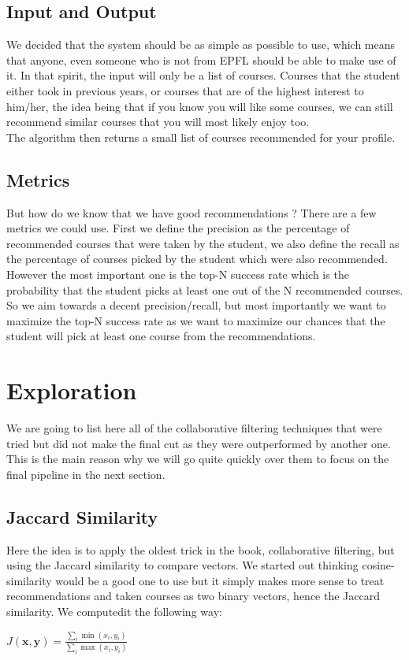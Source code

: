 \documentclass{article}
\begin{document}
    \subsection{Input and Output}
        We decided that the system should be as simple as possible to use, which means that anyone, even someone who is not from EPFL should be able to make use of it. In that spirit, the input will only be a list of courses. Courses that the student either took in previous years, or courses that are of the highest interest to him/her, the idea being that if you know you will like some courses, we can still recommend similar courses that you will most likely enjoy too.
        \\The algorithm then returns a small list of courses recommended for your profile.

    \subsection{Metrics}
        But how do we know that we have good recommendations ? There are a few metrics we could use. First we define the precision as the percentage of recommended courses that were taken by the student, we also define the recall as the percentage of courses picked by the student which were also recommended.
        \\However the most important one is the top-N success rate which is the probability that the student picks at least one out of the N recommended courses. So we aim towards a decent precision/recall, but most importantly we want to maximize the top-N success rate as we want to maximize our chances that the student will pick at least one course from the recommendations.

\newpage
\section{Exploration}
    We are going to list here all of the collaborative filtering techniques that were tried but did not make the final cut as they were outperformed by another one. This is the main reason why we will go quite quickly over them to focus on the final pipeline in the next section.

    \subsection{Jaccard Similarity}
        Here the idea is to apply the oldest trick in the book, collaborative filtering, but using the Jaccard similarity\cite{jaccard} to compare vectors. We started out thinking cosine-similarity would be a good one to use but it simply makes more sense to treat recommendations and taken courses as two binary vectors, hence the Jaccard similarity\cite{jaccard}. We computedit the following way:
        \begin{center}
        $J(\mathbf{x}, \mathbf{y}) = \frac{\sum_i \min(x_i, y_i)}{\sum_i \max(x_i, y_i)}$
        \end{center}
\end{document}
